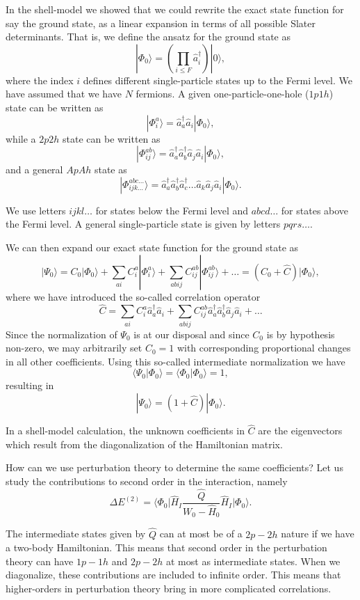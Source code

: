 \documentclass[%
twoside,                 %
final,                   %
10pt]{article}
\begin{document}
In the shell-model we showed that we could rewrite the exact state function for say the ground state, as a linear expansion in terms of all possible Slater determinants. That is, we 
define the ansatz for the ground state as 
\[
|\Phi_0\rangle = \left(\prod_{i\le F}\hat{a}_{i}^{\dagger}\right)|0\rangle,
\]
where the index $i$ defines different single-particle states up to the Fermi level. We have assumed that we have $N$ fermions. 
A given one-particle-one-hole ($1p1h$) state can be written as
\[
|\Phi_i^a\rangle = \hat{a}_{a}^{\dagger}\hat{a}_i|\Phi_0\rangle,
\]
while a $2p2h$ state can be written as
\[
|\Phi_{ij}^{ab}\rangle = \hat{a}_{a}^{\dagger}\hat{a}_{b}^{\dagger}\hat{a}_j\hat{a}_i|\Phi_0\rangle,
\]
and a general $ApAh$ state as 
\[
|\Phi_{ijk\dots}^{abc\dots}\rangle = \hat{a}_{a}^{\dagger}\hat{a}_{b}^{\dagger}\hat{a}_{c}^{\dagger}\dots\hat{a}_k\hat{a}_j\hat{a}_i|\Phi_0\rangle.
\]

We use letters $ijkl\dots$ for states below the Fermi level and $abcd\dots$ for states above the Fermi level. A general single-particle state is given by letters $pqrs\dots$.

We can then expand our exact state function for the ground state 
as
\[
|\Psi_0\rangle=C_0|\Phi_0\rangle+\sum_{ai}C_i^a|\Phi_i^a\rangle+\sum_{abij}C_{ij}^{ab}|\Phi_{ij}^{ab}\rangle+\dots
=(C_0+\hat{C})|\Phi_0\rangle,
\]
where we have introduced the so-called correlation operator 
\[
\hat{C}=\sum_{ai}C_i^a\hat{a}_{a}^{\dagger}\hat{a}_i  +\sum_{abij}C_{ij}^{ab}\hat{a}_{a}^{\dagger}\hat{a}_{b}^{\dagger}\hat{a}_j\hat{a}_i+\dots
\]
Since the normalization of $\Psi_0$ is at our disposal and since $C_0$ is by hypothesis non-zero, we may arbitrarily set $C_0=1$ with 
corresponding proportional changes in all other coefficients. Using this so-called intermediate normalization we have
\[
\langle \Psi_0 | \Phi_0 \rangle = \langle \Phi_0 | \Phi_0 \rangle = 1, 
\]
resulting in 
\[
|\Psi_0\rangle=(1+\hat{C})|\Phi_0\rangle.
\]

In a shell-model calculation, the unknown coefficients in $\hat{C}$ are the 
eigenvectors which result from the diagonalization of the Hamiltonian matrix.

How can we use perturbation theory to determine the same coefficients? Let us study the contributions to second order in the interaction, namely
\[
\Delta E^{(2)}=\langle\Phi_0\vert \hat{H}_I\frac{\hat{Q}}{W_0-\hat{H}_0}\hat{H}_I\vert \Phi_0\rangle.
\]

The intermediate states given by $\hat{Q}$ can at most be of a $2p-2h$ nature if we have a two-body Hamiltonian. This means that second order in the perturbation theory can have $1p-1h$ and $2p-2h$ at most as intermediate states. When we diagonalize, these contributions are included to infinite order. This means that higher-orders in perturbation theory bring in more complicated correlations. 
\end{document}
